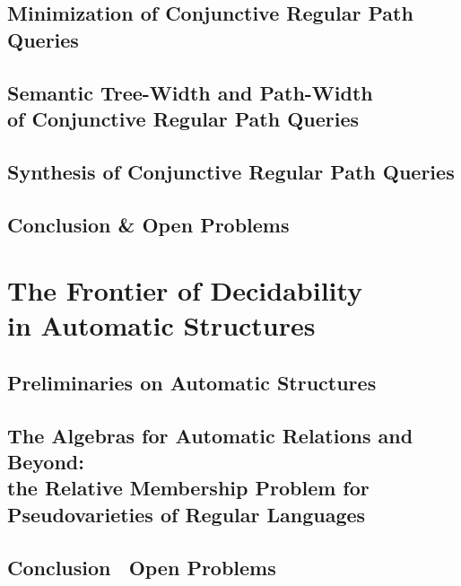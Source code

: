 \documentclass[a4paper,sfsidenotes,twoside,justified,nobib]{tufte-book-custom}
\begin{document}
\chapter{Minimization of Conjunctive Regular Path Queries}

\chapter[{Semantic Tree-Width and Path-Width of Conjunctive Regular Path Queries}]{Semantic Tree-Width and Path-Width\\of Conjunctive Regular Path Queries}

\chapter{Synthesis of Conjunctive Regular Path Queries}

\chapter{Conclusion \& Open Problems}

\part[The Frontier of Decidability in Automatic Structures]{The Frontier of Decidability\\in Automatic Structures}

\chapter{Preliminaries on Automatic Structures}



\chapter{The Algebras for Automatic Relations and Beyond:\\the Relative Membership Problem for Pseudovarieties of Regular Languages}

\chapter{Conclusion \fancyand~Open Problems}


\backmatter
\begin{fullwidth}
	\printbibliography
\end{fullwidth}
\end{document}
